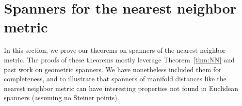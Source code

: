 \section{Spanners for the nearest neighbor metric}
In this section, we prove our theorems on spanners of the nearest neighbor
metric. The proofs of these theorems mostly leverage Theorem~\ref{thm:NN}
and past work on geometric spanners. We have nonetheless included them
for completeness, and to illustrate that spanners of
manifold distances like the nearest neighbor metric can have interesting
properties not found in Euclidean spanners (assuming no Steiner points).


